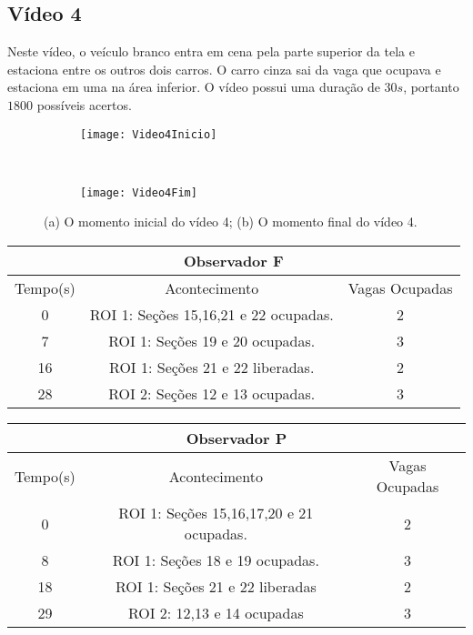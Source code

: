 \subsection{Vídeo 4}

Neste vídeo, o veículo branco entra em cena pela parte superior da tela e estaciona entre os outros dois carros. O carro cinza sai da vaga que ocupava e estaciona em uma na área inferior. O vídeo possui uma duração de $30s$, portanto $1800$ possíveis acertos.

\begin{figure}[!h]
\centering
\begin{subfigure}{.5\textwidth}
\centering
\texttt{[image: Video4Inicio]}
\caption{}
\end{subfigure}\
\begin{subfigure}{.5\textwidth}
\centering
\texttt{[image: Video4Fim]}
\caption{}
\end{subfigure}
\centering
\caption{(a) O momento inicial do vídeo 4; (b) O momento final do vídeo 4.}%
\label{}%
\end{figure}

\begin{center}
\begin{tabular}{|c||c||c|}
\hline
\multicolumn{3}{|c|}{Observador F}  \\ \hline \hline
Tempo(s) & Acontecimento & Vagas Ocupadas\\ \hline
0 & ROI 1: Seções 15,16,21 e 22 ocupadas. & 2 \\ \hline
7 & ROI 1: Seções 19 e 20 ocupadas. & 3 \\ \hline
16 & ROI 1: Seções 21 e 22 liberadas. & 2 \\ \hline
28 & ROI 2: Seções 12 e 13 ocupadas. & 3 \\
\hline
\end{tabular}
\end{center}

\begin{center}
\begin{tabular}{|c||c||c|}
\hline
\multicolumn{3}{|c|}{Observador P}  \\ \hline \hline
Tempo(s) & Acontecimento & Vagas Ocupadas\\ \hline
0 & ROI 1: Seções 15,16,17,20 e 21 ocupadas. & 2 \\ \hline
8 & ROI 1: Seções 18 e 19 ocupadas. & 3 \\ \hline
18 & ROI 1: Seções 21 e 22 liberadas & 2 \\ \hline
29 & ROI 2: 12,13 e 14 ocupadas & 3 \\
\hline
\end{tabular}
\end{center}

